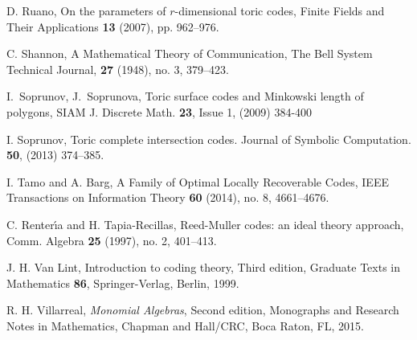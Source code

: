 \documentclass[12pt]{amsart}
\theoremstyle{plain}
\begin{document}
\begin{thebibliography}{99}
D. Ruano, 
{On the parameters of $r$-dimensional toric codes},
Finite Fields and Their Applications {\bf 13} (2007), pp. 962--976.

 C. Shannon,
A Mathematical Theory of Communication,
The Bell System Technical Journal, {\bf 27} (1948), no. 3, 379--423.

 I.~Soprunov, J.~Soprunova, {Toric surface codes and Minkowski length of polygons}, SIAM J. Discrete Math. {\bf 23}, Issue 1, (2009) 384-400 

 I. Soprunov,  {Toric complete intersection codes.} Journal of Symbolic Computation. {\bf 50}, (2013) 374--385.

 I. Tamo and A. Barg,
A Family of Optimal Locally Recoverable Codes,
IEEE Transactions on Information Theory {\bf 60} (2014), no. 8, 4661--4676.

 C. Renter\'\i a and H. Tapia-Recillas, 
Reed-Muller codes: an ideal theory approach, Comm. Algebra {\bf 25}
(1997), no. 2, 401--413.

 J. H. Van Lint,
{ Introduction to coding theory},
Third edition, Graduate Texts in Mathematics {\bf 86}, Springer-Verlag, Berlin, 1999.

 R. H. Villarreal, {\it Monomial Algebras\/},
Second edition, 
Monographs and Research Notes in Mathematics, Chapman and Hall/CRC,
Boca Raton, FL, 2015.
\end{thebibliography}
\end{document}
